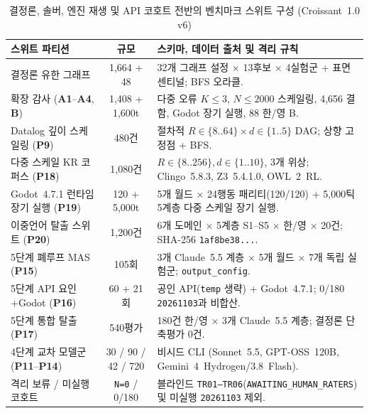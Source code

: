 \begin{table}[!tbp]
\caption{결정론, 솔버, 엔진 재생 및 API 코호트 전반의 벤치마크 스위트 구성 (Croissant~1.0 v6)}
\label{tab:phase6-db-comp}
\centering
\scriptsize
\setlength{\tabcolsep}{3pt}
\begin{tabularx}{\columnwidth}{@{}>{\raggedright\arraybackslash}p{}c>{\raggedright\arraybackslash}X@{}}
\toprule
\textbf{스위트 파티션} & \textbf{규모} & \textbf{스키마, 데이터 출처 및 격리 규칙} \\
\midrule
결정론 유한 그래프 & 1,664 + 48 & 32개 그래프 설정 $\times$ 13후보 $\times$ 4실험군 + 표면 센티널; BFS 오라클. \\
확장 감사 (\textbf{A1}--\textbf{A4}, \textbf{B}) & 1,408 + 1,600t & 다중 오류 $K{\le}3$, $N{\le}2000$ 스케일링, 4,656 결함, Godot 장기 실행, 88 한/영 B. \\
Datalog 깊이 스케일링 (\textbf{P9}) & 480건 & 절차적 $R{\in}\{8..64\}\times d{\in}\{1..5\}$ DAG; 상향 고정점 + BFS. \\
다중 스케일 KR 코퍼스 (\textbf{P18}) & 1,080건 & $R{\in}\{8..256\}, d{\in}\{1..10\}$, 3개 위상; Clingo~5.8.3, Z3~5.4.1.0, OWL~2~RL. \\
Godot~4.7.1 런타임 장기 실행 (\textbf{P19}) & 120 + 5,000t & 5개 월드 $\times$ 24행동 패리티(120/120) + 5,000틱 5계층 다중 스케일 장기 실행. \\
이중언어 탈출 스위트 (\textbf{P20}) & 1,200건 & 6개 도메인 $\times$ 5계층 S1--S5 $\times$ 한/영 $\times$ 20건; SHA-256 \texttt{1af8be38...}. \\
5단계 폐루프 MAS (\textbf{P15}) & 105회 & 3개 Claude~5.5 계층 $\times$ 5개 월드 $\times$ 7개 독립 실험군; \texttt{output\_config}. \\
5단계 API 요인+Godot (\textbf{P16}) & 60 + 21회 & 공인 API(\texttt{temp} 생략) + Godot~4.7.1; 0/180 \texttt{20261103}과 비합산. \\
5단계 통합 탈출 (\textbf{P17}) & 540평가 & 180건 한/영 $\times$ 3개 Claude~5.5 계층; 결정론 단축평가 0건. \\
4단계 교차 모델군 (\textbf{P11}--\textbf{P14}) & 30 / 90 / 42 / 720 & 비시드 CLI (Sonnet~5.5, GPT-OSS~120B, Gemini~4~Hydrogen/3.8~Flash). \\
격리 보류 / 미실행 코호트 & \texttt{N=0} / 0/180 & 블라인드 \texttt{TR01--TR06}(\texttt{AWAITING\_HUMAN\_RATERS}) 및 미실행 \texttt{20261103} 제외. \\
\bottomrule
\end{tabularx}
\end{table}

